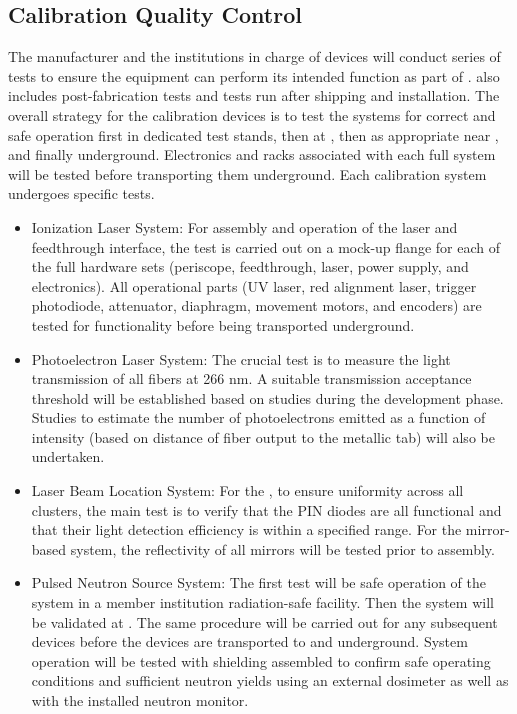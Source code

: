 \subsection{Calibration Quality Control}

The manufacturer and the institutions in charge of devices will
conduct  series of tests to ensure the equipment can perform its
intended function as part of . 
also includes post-fabrication tests and tests run after shipping and
installation. The overall strategy for the calibration devices is to
test the systems for correct and safe operation first in dedicated test
stands, then at , then as appropriate near ,
and finally underground. Electronics and racks associated with each full
system will be tested before transporting them underground. Each calibration
system undergoes specific tests.
\begin{itemize}
\item Ionization Laser System: For assembly and operation of the laser
  and feedthrough interface, %
  the test is carried out on a mock-up
  flange for each of the full hardware sets (periscope, feedthrough,
  laser, power supply, and electronics). All operational parts (UV
  laser, red alignment laser, trigger photodiode, attenuator,
  diaphragm, movement motors, and encoders) are tested for
  functionality before being transported underground.
\item Photoelectron Laser System: The crucial test is to measure the
  light transmission of all fibers at 266 nm. A suitable transmission
  acceptance threshold will be established based on studies during the
  development phase. Studies to estimate the number of photoelectrons
  emitted as a function of intensity (based on distance of fiber
  output to the metallic tab) will also be undertaken.
\item Laser Beam Location System: For the , to ensure uniformity
  across all clusters, the main test is to verify 
   that the PIN diodes are all functional and that their light
  detection efficiency is within a specified range. For the mirror-based system, the reflectivity
  of all mirrors will  be tested prior to assembly.
\item Pulsed Neutron Source System: The first test will be safe
  operation of the system in a member institution radiation-safe
  facility. Then the system will be validated at . The
  same procedure will be carried out for any subsequent devices before
  the devices are transported to  and underground. System
  operation will be tested with shielding assembled to confirm safe
  operating conditions and sufficient neutron yields using an external
  dosimeter as well as with the installed neutron monitor.
\end{itemize}

